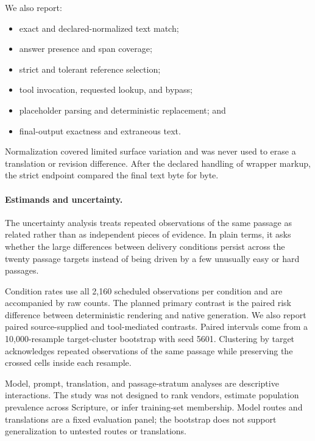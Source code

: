 \documentclass[11pt]{article}
\begin{document}
We also report:

\begin{itemize}[leftmargin=*,topsep=4pt,itemsep=2pt]
  \item exact and declared-normalized text match;
  \item answer presence and span coverage;
  \item strict and tolerant reference selection;
  \item tool invocation, requested lookup, and bypass;
  \item placeholder parsing and deterministic replacement; and
  \item final-output exactness and extraneous text.
\end{itemize}

Normalization covered limited surface variation and was never used to erase a
translation or revision difference. After the declared handling of wrapper markup, the strict
endpoint compared the final text byte for byte.

\paragraph{Estimands and uncertainty.}

The uncertainty analysis treats repeated observations of the same passage as
related rather than as independent pieces of evidence. In plain terms, it asks
whether the large differences between delivery conditions persist across the
twenty passage targets instead of being driven by a few unusually easy or hard
passages.

Condition rates use all 2,160 scheduled observations per condition and are
accompanied by raw counts. The planned primary contrast is the paired risk
difference between deterministic rendering and native generation. We also
report paired source-supplied and tool-mediated contrasts. Paired intervals
come from a 10,000-resample target-cluster bootstrap with seed 5601. Clustering
by target acknowledges repeated observations of the same passage while
preserving the crossed cells inside each resample.

Model, prompt, translation, and passage-stratum analyses are descriptive
interactions. The study was not designed to rank vendors, estimate population
prevalence across Scripture, or infer training-set membership. Model routes
and translations are a fixed evaluation panel; the bootstrap does not support
generalization to untested routes or translations.
\end{document}
